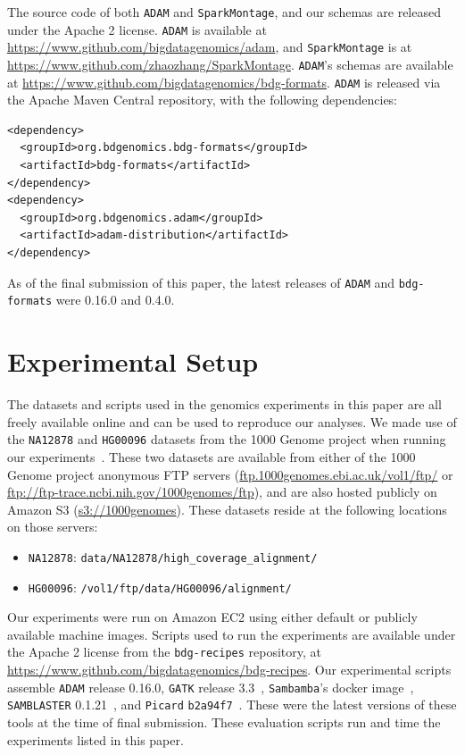 \documentclass{acm_proc_article-sp}
\begin{document}
The source code of both \texttt{ADAM} and \texttt{SparkMontage}, and our schemas are released under the Apache 2
license. \texttt{ADAM} is available at \url{https://www.github.com/bigdatagenomics/adam}, and \texttt{SparkMontage}
is at \url{https://www.github.com/zhaozhang/SparkMontage}. \texttt{ADAM}'s schemas are available at
\url{https://www.github.com/bigdatagenomics/bdg-formats}. \linebreak \texttt{ADAM} is released via the Apache Maven
Central repository, with the following dependencies:

\begin{verbatim}
<dependency>
  <groupId>org.bdgenomics.bdg-formats</groupId>
  <artifactId>bdg-formats</artifactId>
</dependency>
<dependency>
  <groupId>org.bdgenomics.adam</groupId>
  <artifactId>adam-distribution</artifactId>
</dependency>
\end{verbatim}

As of the final submission of this paper, the latest releases of \texttt{ADAM} and \texttt{bdg-formats} were 0.16.0 and 0.4.0.

\section{Experimental Setup}
\label{sec:experimental-setup}

The datasets and scripts used in the genomics experiments in this paper are all freely available online
and can be used to reproduce our analyses. We made use of the \texttt{NA12878} and \texttt{HG00096}
datasets from the 1000 Genome project when running our experiments~\cite{siva08}. These two datasets
are available from either of the 1000 Genome project anonymous FTP servers
(\url{ftp.1000genomes.ebi.ac.uk/vol1/ftp/} or \url{ftp://ftp-trace.ncbi.nih.gov/1000genomes/ftp}), and are
also hosted publicly on Amazon S3 (\url{s3://1000genomes}). These datasets reside at the following
locations on those servers:

\begin{itemize}
\item \texttt{NA12878}: \texttt{data/NA12878/high\_coverage\_alignment/}
\item \texttt{HG00096}: \texttt{/vol1/ftp/data/HG00096/alignment/}
\end{itemize}

Our experiments were run on Amazon EC2 using either default or publicly available machine images.
Scripts used to run the experiments are available under the Apache 2 license from the \texttt{bdg-recipes} 
repository, at \url{https://www.github.com/bigdatagenomics/bdg-recipes}. Our experimental scripts
assemble \texttt{ADAM} release 0.16.0, \texttt{GATK} release 3.3~\cite{depristo11}, \texttt{Sambamba}'s docker
image~\cite{tarasov15}, \texttt{SAMBLASTER} 0.1.21~\cite{faust14}, and \texttt{Picard}
\texttt{b2a94f7}~\cite{picard}. These were the latest versions of these tools at the time of final submission. These
evaluation scripts run and time the experiments listed in this paper.

\balance
\end{document}

